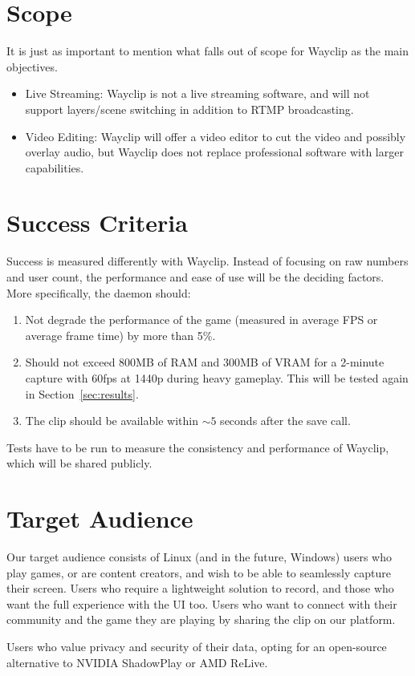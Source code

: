 \section{Scope}

It is just as important to mention what falls out of scope for Wayclip as the main objectives.

\begin{itemize}
	\item Live Streaming: Wayclip is not a live streaming software, and will not support layers/scene switching in addition to RTMP broadcasting.
	\item Video Editing: Wayclip will offer a video editor to cut the video and possibly overlay audio, but Wayclip does not replace professional software with larger capabilities.
\end{itemize}

\section{Success Criteria}

Success is measured differently with Wayclip. Instead of focusing on raw numbers and user count, the performance and ease of use will be the deciding factors.
More specifically, the daemon should:
\begin{enumerate}[label=(\alph*)]
	\item Not degrade the performance of the game (measured in average FPS or average frame time) by more than 5\%.
	\item Should not exceed 800MB of RAM and 300MB of VRAM for a 2-minute capture with 60fps at 1440p during heavy gameplay. This will be tested again in Section~\ref{sec:results}.
	\item The clip should be available within $\sim5$ seconds after the save call.
\end{enumerate}

Tests have to be run to measure the consistency and performance of Wayclip, which will be shared publicly.


\section{Target Audience}

Our target audience consists of Linux (and in the future, Windows) users who play games, or are content creators, and wish to be able to seamlessly capture their screen.
Users who require a lightweight solution to record, and those who want the full experience with the UI too. Users who want to connect with their community and the game they are playing by sharing the clip on our platform.

Users who value privacy and security of their data, opting for an open-source alternative to NVIDIA ShadowPlay or AMD ReLive.
